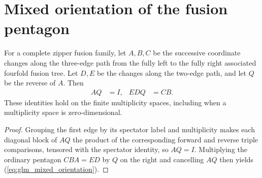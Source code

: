 \section{Mixed orientation of the fusion pentagon}
\label{sec:glm_mixed_orientation}

\begin{lemma}
    \leanok
    \label{thm:glm_mixed_orientation}
    For a complete zipper fusion family, let $A,B,C$ be the successive
    coordinate changes along the three-edge path from the fully left to the
    fully right associated fourfold fusion tree. Let $D,E$ be the changes
    along the two-edge path, and let $Q$ be the reverse of $A$. Then
    \begin{align}
        AQ & =I, & EDQ & =CB.
        \label{eq:glm_mixed_orientation}
    \end{align}
    These identities hold on the finite multiplicity spaces, including
    when a multiplicity space is zero-dimensional.
\end{lemma}
\begin{proof}
    \leanok
    Grouping the first edge by its spectator label and multiplicity makes
    each diagonal block of $AQ$ the product of the corresponding forward
    and reverse triple comparisons, tensored with the spectator identity,
    so $AQ=I$. Multiplying the ordinary pentagon $CBA=ED$ by $Q$ on the
    right and cancelling $AQ$ then yields (\ref{eq:glm_mixed_orientation}).
\end{proof}


